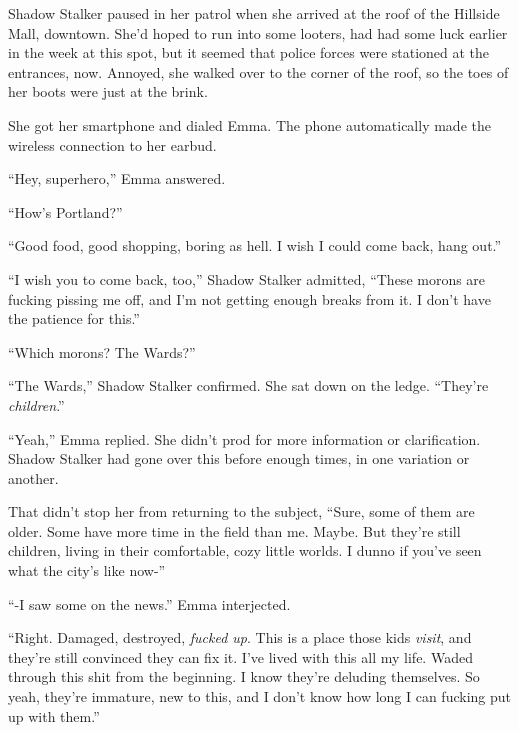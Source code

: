 





Shadow Stalker paused in her patrol when she arrived at the roof of the Hillside Mall, downtown.  She'd hoped to run into some looters, had had some luck earlier in the week at this spot, but it seemed that police forces were stationed at the entrances, now.  Annoyed, she walked over to the corner of the roof, so the toes of her boots were just at the brink.



She got her smartphone and dialed Emma.  The phone automatically made the wireless connection to her earbud.



``Hey, superhero,'' Emma answered.



``How's Portland?''



``Good food, good shopping, boring as hell.  I wish I could come back, hang out.''



``I wish you to come back, too,'' Shadow Stalker admitted, ``These morons are fucking pissing me off, and I'm not getting enough breaks from it.  I don't have the patience for this.''



``Which morons?  The Wards?''



``The Wards,'' Shadow Stalker confirmed.  She sat down on the ledge.  ``They're \emph{children}.''



``Yeah,'' Emma replied.  She didn't prod for more information or clarification.  Shadow Stalker had gone over this before enough times, in one variation or another.



That didn't stop her from returning to the subject, ``Sure, some of them are older.  Some have more time in the field than me.  Maybe.  But they're still children, living in their comfortable, cozy little worlds.  I dunno if you've seen what the city's like now-''



``-I saw some on the news.'' Emma interjected.



``Right.  Damaged, destroyed, \emph{fucked up}.  This is a place those kids \emph{visit}, and they're still convinced they can fix it.  I've lived with this all my life.  Waded through this shit from the beginning.  I know they're deluding themselves.  So yeah, they're immature, new to this, and I don't know how long I can fucking put up with them.''



